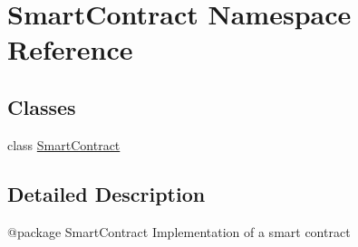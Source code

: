 \hypertarget{namespace_smart_contract}{}\section{Smart\+Contract Namespace Reference}
\label{namespace_smart_contract}
\subsection*{Classes}
\begin{DoxyCompactItemize}
\item 
class \mbox{\hyperlink{class_smart_contract_1_1_smart_contract}{Smart\+Contract}}
\end{DoxyCompactItemize}


\subsection{Detailed Description}
\begin{DoxyVerb}@package SmartContract
Implementation of a smart contract
\end{DoxyVerb}
 